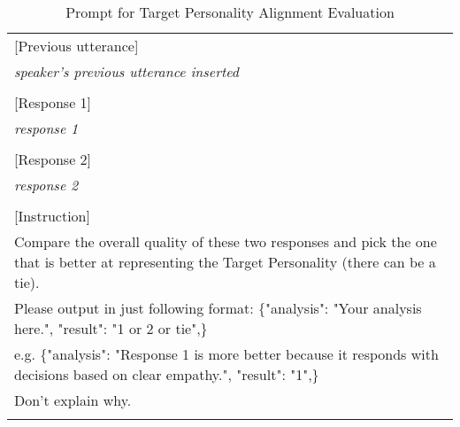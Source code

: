 \begin{table*}[t]
{\begin{tabularx}{\textwidth}{X}
\\
{[Previous utterance]} \\
\textit{speaker's previous utterance inserted} \\
\\
{[Response 1]} \\
\textit{response 1} \\
\\                        
{[Response 2]}\\
\textit{response 2} \\
\\
{[Instruction]} \\
Compare the overall quality of these two responses and pick the one that is better at representing the Target Personality (there can be a tie).\\
Please output in just following format: {\{"analysis": "Your analysis here.", "result": "1 or 2 or tie",\}} \\
e.g. {\{"analysis": "Response 1 is more better because it responds with decisions based on clear empathy.", "result": "1",\}} \\
Don't explain why.\\
\\
\hline
\hline
\end{tabularx}}
\caption{Prompt for Target Personality Alignment Evaluation}
\label{tab:evaluation_prompt}
\end{table*}